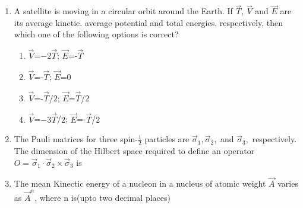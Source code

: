 \documentclass[journal,12pt,onecolumn]{IEEEtran}
\theoremstyle{remark}
\begin{document}
\begin{enumerate}
    \item A satellite is moving in a circular orbit around the Earth. If $\vec{T}$, $\vec{V}$ and $\vec{E}$ are its average kinetic. average potential and total energies, respectively, then which one of the following options is correct?
    \begin{enumerate}
    \item $\vec{V}$=$-2\vec{T}$; $\vec{E}$=-$\vec{T}$
    \item $\vec{V}$=-$\vec{T}$; $\vec{E}$=$0$
    \item $\vec{V}$=-$\vec{T}$/$2$; $\vec{E}$=$\vec{T}$/$2$
    \item $\vec{V}$=$-3\vec{T}$/$2$; $\vec{E}$=-$\vec{T}$/$2$ 
    \end{enumerate}

    \item The Pauli matrices for three spin-$\frac{1}{2}$ particles are $\vec{\sigma}_1, \vec{\sigma}_2,$ and $\vec{\sigma}_3,$ respectively. The dimension of the Hilbert space required to define an operator $O = \vec{\sigma}_1 \cdot\vec{\sigma}_2 \times \vec{\sigma}_3$ is \underline{\phantom{black}}

    \item The mean Kinectic energy of a nucleon in a nucleus of atomic weight $\vec{A}$ varies as $\vec{A}^n$, where n is\underline{\phantom{black}}(upto two decimal places)
 
\end{enumerate}
\end{document}
